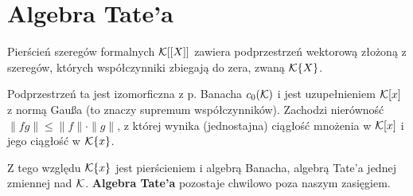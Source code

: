 \section{Algebra Tate'a}
Pierścień szeregów formalnych $\mathcal K[[X]]$ zawiera podprzestrzeń wektorową złożoną z szeregów, których współczynniki zbiegają do zera, zwaną $\mathcal K\{X\}$.

Podprzestrzeń ta jest izomorficzna z p. Banacha $c_0(\mathcal K)$ i jest uzupełnieniem $\mathcal K[x]$ z normą Gaußa (to znaczy supremum współczynników).
Zachodzi nierówność $\|fg\| \le \|f\| \cdot \|g\|$, z której wynika (jednostajna) ciągłość mnożenia w $\mathcal K[x]$ i jego ciągłość w $\mathcal K\{x\}$.

Z tego względu $\mathcal K\{x\}$ jest pierścieniem i algebrą Banacha, algebrą Tate'a jednej zmiennej nad $\mathcal K$.
\textbf{Algebra Tate'a} pozostaje chwilowo poza naszym zasięgiem. 